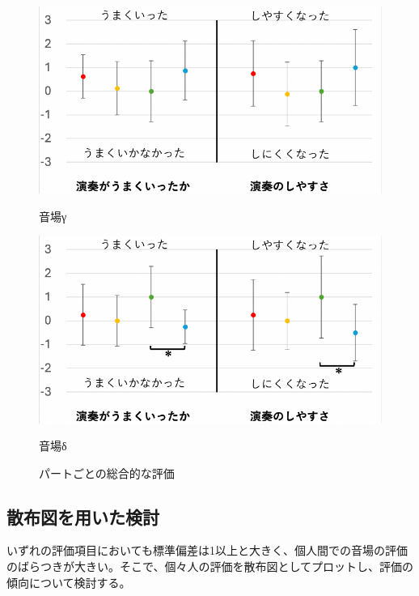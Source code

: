 \documentclass[11pt,a4j]{jreport}
\begin{document}
\begin{figure}[H]
  \vspace{1\baselineskip}

  \begin{minipage}{.5\linewidth}
    \centering
    \includegraphics[scale=.55]{images/subjectiveExp/statisticAnalysis/part_overall_c.pdf}
    \caption*{音場γ}
    \label{fig:総合的な評価γ}
  \end{minipage}%
  \begin{minipage}{.5\linewidth}
    \centering
    \includegraphics[scale=.55]{images/subjectiveExp/statisticAnalysis/part_overall_d.pdf}
    \caption*{音場δ}
    \label{fig:総合的な評価δ}
  \end{minipage}
  
  \caption{パートごとの総合的な評価}
  \label{fig:パートごとの総合的な評価}
  
\end{figure}

\newpage

\subsection{散布図を用いた検討}
いずれの評価項目においても標準偏差は1以上と大きく、個人間での音場の評価のばらつきが大きい。そこで、個々人の評価を散布図としてプロットし、評価の傾向について検討する。
\end{document}
